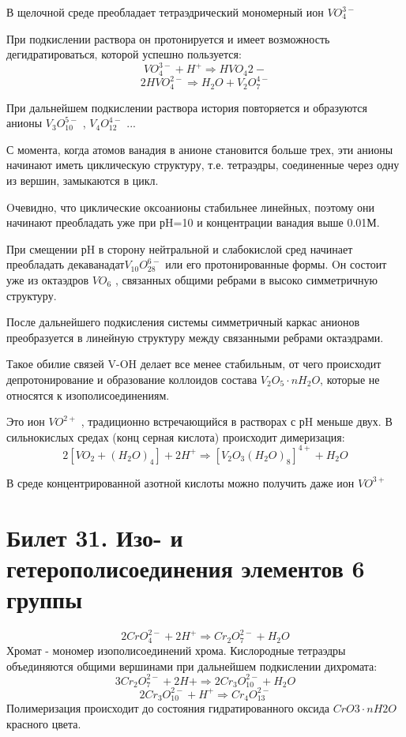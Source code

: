 \documentclass[11pt]{article}
\begin{document}
В щелочной среде
преобладает
тетраэдрический
мономерный ион $VO _4 ^{3-}$



При подкислении
раствора он
протонируется и имеет
возможность
дегидратироваться,
которой успешно
пользуется:
$$VO _4 ^{3-} +H ^+\Rightarrow HVO _4 {2-}$$
$$2HVO _4 ^{2-} \Rightarrow H _2 O+V _2 O _7 ^{4-}$$

При дальнейшем
подкислении раствора история повторяется и образуются анионы
$V _3 O _{10} ^{5-}$ , $V _4 O _{12} ^{4-}$ ... 

С момента, когда атомов ванадия в анионе
становится больше трех, эти анионы начинают иметь циклическую
структуру, т.е. тетраэдры, соединенные через одну из вершин,
замыкаются в цикл. 

Oчевидно, что циклические оксоанионы
стабильнее линейных, поэтому они начинают преобладать уже при
рH=10 и концентрации ванадия выше 0.01М. 

При смещении рH в
сторону нейтральной и слабокислой сред начинает преобладать
декаванадат$ V _{10} O _{28} ^{6-}$ или его протонированные формы. Oн состоит
уже из октаэдров $VO _6$ , связанных общими ребрами в высоко
симметричную структуру. 

После дальнейшего подкисления системы
симметричный каркас анионов преобразуется в линейную структуру
между связанными ребрами октаэдрами. 

Такое обилие связей V-OH
делает все менее стабильным, от чего происходит
депротонирование и образование коллоидов состава $V _2 O _5 \cdot nH _2 O$,
которые не относятся к изополисоединениям.

 Это ион $VO ^{2+}$ ,
традиционно встречающийся в растворах с рH меньше двух. В
сильнокислых средах (конц серная кислота) происходит
димеризация: 
$$2[VO _2 + (H _2 O) _4 ]+2H^+ \Rightarrow[V _2 O _3 (H _2 O) _8 ] ^{4+} +H _2 O$$

В среде концентрированной азотной кислоты можно получить даже
ион $VO^{3+}$





\section{Билет 31. Изо- и гетерополисоединения элементов 6 группы}

$$2CrO _4 ^{2-} +2H ^+ \Rightarrow Cr _2 O _7 ^{2-} +H _2 O$$
Хромат - мономер изополисоединений хрома. Кислородные тетраэдры
объединяются общими вершинами при дальнейшем подкислении дихромата:
$$3Cr _2 O _7 ^{2-} +2H + \Rightarrow 2Cr _3 O _{10} ^{2-} + H _2 O$$
$$2Cr _3 O _{10} ^{2-} +H^+ \Rightarrow Cr _4 O _{13} ^{2-} $$
Полимеризация происходит до состояния гидратированного оксида $CrO 3 \cdot nH 2 O$
красного цвета.
\end{document}
